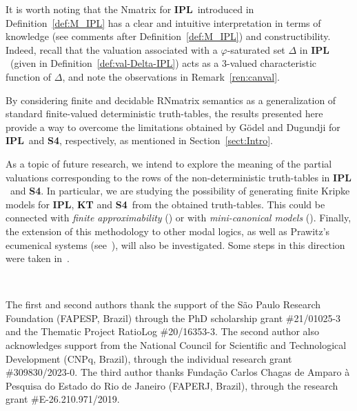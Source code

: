\documentclass[12pt]{article}
\newcommand{\ipl}{\ensuremath{\mathbf{IPL}}}
\newcommand{\sfo}{\textbf{S4}}
\begin{document}
It is worth noting that the Nmatrix for \ipl\ introduced in Definition~\ref{def:M_IPL} has a clear and intuitive interpretation in terms of knowledge (see comments after Definition~\ref{def:M_IPL}) and constructibility. Indeed, recall that the valuation associated with a $\varphi$-saturated set $\Delta$ in \ipl\ (given in Definition~\ref{def:val-Delta-IPL}) acts as a 3-valued characteristic function of $\Delta$, and note the observations in Remark~\ref{ren:canval}.

By considering finite and decidable RNmatrix semantics as a generalization of standard finite-valued deterministic truth-tables, the results presented here provide a way to overcome the limitations obtained by G\"odel and Dugundji for \ipl\ and \sfo, respectively, as mentioned in Section~\ref{sect:Intro}.

As a topic of future research, we intend to explore the meaning of the partial valuations corresponding to the rows of the non-deterministic truth-tables in \ipl\ and \sfo. In particular, we are studying the possibility of generating finite Kripke models for \ipl, {\bf KT} and \sfo\ from the obtained truth-tables. This could be connected with {\em finite approximability} (\cite[p. 49 and Ch.~11]{cha:Zakh:97}) or with {\em mini-canonical models} (\cite[Ch.~8]{hughes_cresswell_1996}). Finally, the extension of this methodology to other modal logics, as well as Prawitz's ecumenical systems (see~\cite{prawitz}), will also be investigated. Some steps in this direction were taken in~\cite{lem:ola:pim:con:25}.

\

The first and second authors thank the support of the S\~ao Paulo Research Foundation (FAPESP, Brazil) through the PhD scholarship grant \#21/01025-3 and the Thematic Project RatioLog \#20/16353-3. The second author also acknowledges support from the National Council for Scientific and Technological Development (CNPq, Brazil), through the individual research grant \#309830/2023-0. The third author thanks Funda\c c\~ao Carlos Chagas de Amparo \`a Pesquisa do Estado do Rio de Janeiro (FAPERJ, Brazil), through the research grant \#E-26.210.971/2019.
\end{document}
